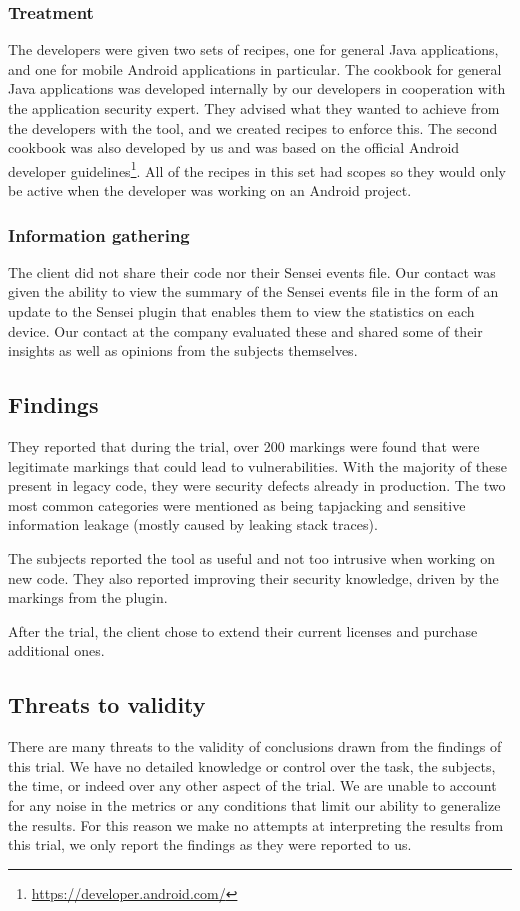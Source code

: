 \subsubsection{Treatment}
The developers were given two sets of recipes, one for general Java applications, and one for mobile Android applications in particular.
The cookbook for general Java applications was developed internally by our developers in cooperation with the application security expert.
They advised what they wanted to achieve from the developers with the tool, and we created recipes to enforce this.
The second cookbook was also developed by us and was based on the official Android developer guidelines\footnote{\url{https://developer.android.com/}}.
All of the recipes in this set had scopes so they would only be active when the developer was working on an Android project.

\subsubsection{Information gathering}
The client did not share their code nor their Sensei events file.
Our contact was given the ability to view the summary of the Sensei events file in the form of an update to the Sensei plugin that enables them to view the statistics on each device.
Our contact at the company evaluated these and shared some of their insights as well as opinions from the subjects themselves.

\subsection{Findings}
They reported that during the trial, over 200 markings were found that were legitimate markings that could lead to vulnerabilities. With the majority of these present in legacy code, they were \glspl{security defect} already in production. The two most common categories were mentioned as being tapjacking and sensitive information leakage (mostly caused by leaking stack traces).

The subjects reported the tool as useful and not too intrusive when working on new code. They also reported improving their security knowledge, driven by the markings from the plugin.

After the trial, the client chose to extend their current licenses and purchase additional ones.

\subsection{Threats to validity}
There are many threats to the validity of conclusions drawn from the findings of this trial. We have no detailed knowledge or control over the task, the subjects, the time, or indeed over any other aspect of the trial. We are unable to account for any noise in the metrics or any conditions that limit our ability to generalize the results. For this reason we make no attempts at interpreting the results from this trial, we only report the findings as they were reported to us.